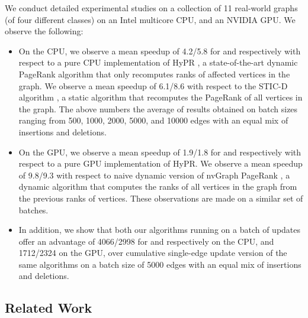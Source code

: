 We conduct detailed experimental studies on a collection of 11 real-world graphs (of four different classes) on an Intel multicore CPU, and an NVIDIA GPU. We observe the following:
\begin{itemize}
\item On the CPU, we observe a mean speedup of {4.2\X/5.8\X} for \monolithicPR{} and \levelwisePR{} respectively with respect to a pure CPU implementation of HyPR \cite{hipc19}, a state-of-the-art dynamic PageRank algorithm that only recomputes ranks of affected vertices in the graph. We observe a mean speedup of {6.1\X/8.6\X} with respect to the STIC-D algorithm \cite{pr-sticd16}, a static algorithm that recomputes the PageRank of all vertices in the graph. The above numbers the average of results obtained on batch sizes ranging from 500, 1000, 2000, 5000, and 10000 edges with an equal mix of insertions and deletions.
\item On the GPU, we observe a mean speedup of {1.9\X/1.8\X} for \monolithicPR{} and \levelwisePR{} respectively with respect to a pure GPU implementation of HyPR. We observe a mean speedup of {9.8\X/9.3\X} with respect to naive dynamic version of nvGraph PageRank \cite{pr-nvgraph}, a dynamic algorithm that computes the ranks of all vertices in the graph from the previous ranks of vertices. These observations are made on a similar set of batches.
\item In addition, we show that both our algorithms running on a batch of updates offer an advantage of {4066\X/2998\X} for \monolithicPR{} and \levelwisePR{} respectively on the CPU, and {1712\X/2324\X} on the GPU, over cumulative single-edge update version of the same algorithms on a batch size of 5000 edges with an equal mix of insertions and deletions.
\end{itemize}




\subsection{Related Work}

